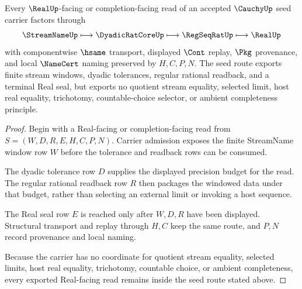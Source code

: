 \begin{theorem}\label{thm:cauchy-seed-real-seal-boundary}
Every $\RealUp$-facing or completion-facing read of an accepted $\CauchyUp$ seed carrier factors through
$$
\StreamNameUp \longmapsto \DyadicRatCoreUp \longmapsto \RegSeqRatUp \longmapsto \RealUp
$$
with componentwise $\hsame$ transport, displayed $\Cont$ replay, $\Pkg$ provenance, and local $\NameCert$ naming preserved by $H,C,P,N$. The seed route exports finite stream windows, dyadic tolerances, regular rational readback, and a terminal Real seal, but exports no quotient stream equality, selected limit, host real equality, trichotomy, countable-choice selector, or ambient completeness principle.
\end{theorem}
\begin{proof}
Begin with a Real-facing or completion-facing read from $S=(W,D,R,E,H,C,P,N)$. Carrier admission exposes the finite StreamName window row $W$ before the tolerance and readback rows can be consumed.

The dyadic tolerance row $D$ supplies the displayed precision budget for the read. The regular rational readback row $R$ then packages the windowed data under that budget, rather than selecting an external limit or invoking a host sequence.

The Real seal row $E$ is reached only after $W,D,R$ have been displayed. Structural transport and replay through $H,C$ keep the same route, and $P,N$ record provenance and local naming.

Because the carrier has no coordinate for quotient stream equality, selected limits, host real equality, trichotomy, countable choice, or ambient completeness, every exported Real-facing read remains inside the seed route stated above.
\end{proof}
